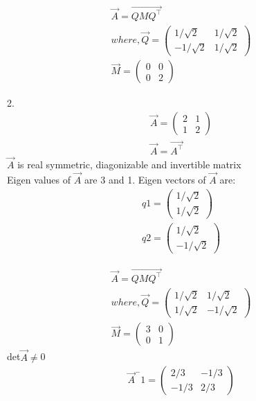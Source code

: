 \documentclass{beamer}
\begin{document}
\begin{frame}
\begin{align}
    \vec{A}=\vec{QMQ^\top}\\
    where, \vec{Q}=\begin{pmatrix}
        1/\sqrt2 & 1/\sqrt2\\-1/\sqrt2 &1/\sqrt2
    \end{pmatrix}\\
    \vec{M}=\begin{pmatrix}
        0&0\\0&2
    \end{pmatrix}
\end{align}
\end{frame}
\begin{frame}
2.
\begin{align}
    \vec{A}=\begin{pmatrix}
        2 & 1\\1& 2
    \end{pmatrix}\\
    \vec{A}=\vec{A^\top}
\end{align}
$\vec{A}$ is real symmetric, diagonizable and invertible matrix\\
Eigen values of $\vec{A}$ are 3 and 1.
Eigen vectors of $\vec{A}$ are:
\begin{align}
    q1=\begin{pmatrix}
        1/\sqrt2\\1/\sqrt2
    \end{pmatrix}\\
    q2=\begin{pmatrix}
        1/\sqrt2\\-1/\sqrt2
    \end{pmatrix}
\end{align}
\end{frame}
\begin{frame}
\begin{align}
    \vec{A}=\vec{QMQ^\top}\\
    where, \vec{Q}=\begin{pmatrix}
        1/\sqrt2 & 1/\sqrt2\\1/\sqrt2 &-1/\sqrt2
    \end{pmatrix}\\
    \vec{M}=\begin{pmatrix}
        3&0\\0&1
    \end{pmatrix}
\end{align}
det$\vec{A}$$\neq$0
\begin{align}
    \vec{A}^-1=\begin{pmatrix}
        2/3 & -1/3\\-1/3 &2/3
    \end{pmatrix}
    \end{align}
\end{frame}
\end{document}
